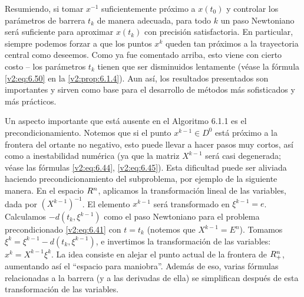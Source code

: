 Resumiendo, si tomar $x^{-1}$ suficientemente próximo a $x(t_0)$ y controlar los parámetros de barrera $t_k$ de manera adecuada, para todo $k$ un paso Newtoniano será suficiente para aproximar $x(t_k)$ con precisión satisfactoria. En particular, siempre podemos forzar a que los puntos $x^k$ queden tan próximos a la trayectoria central como deseemos. Como ya fue comentado arriba, esto viene con cierto costo -- los parámetros $t_k$ tienen que ser disminuidos lentamente (véase la fórmula \eqref{v2:eq:6.50} en la \cref{v2:prop:6.1.4}). Aun así, los resultados presentados son importantes y sirven como base para el desarrollo de métodos más sofisticados y más prácticos.

Un aspecto importante que está ausente en el Algoritmo 6.1.1 es el precondicionamiento. Notemos que si el punto $x^{k-1} \in D^0$ está próximo a la frontera del ortante no negativo, esto puede llevar a hacer pasos muy cortos, así como a inestabilidad numérica (ya que la matriz $X^{k-1}$ será casi degenerada; véase las fórmulas \eqref{v2:eq:6.44}, \eqref{v2:eq:6.45}). Esta dificultad puede ser aliviada haciendo precondicionamiento del subproblema, por ejemplo de la siguiente manera. En el espacio $R^n$, aplicamos la transformación lineal de las variables, dada por $(X^{k-1})^{-1}$. El elemento $x^{k-1}$ será transformado en $\xi^{k-1} = e$. Calculamos $-d(t_k, \xi^{k-1})$ como el paso Newtoniano para el problema precondicionado \eqref{v2:eq:6.41} con $t = t_k$ (notemos que $X^{k-1} = E^n$). Tomamos $\xi^k = \xi^{k-1} - d(t_k, \xi^{k-1})$, e invertimos la transformación de las variables: $x^k = X^{k-1} \xi^k$. La idea consiste en alejar el punto actual de la frontera de $R^n_+$, aumentando así el ``espacio para maniobra''. Además de eso, varias fórmulas relacionadas a la barrera (y a las derivadas de ella) se simplifican después de esta transformación de las variables.

